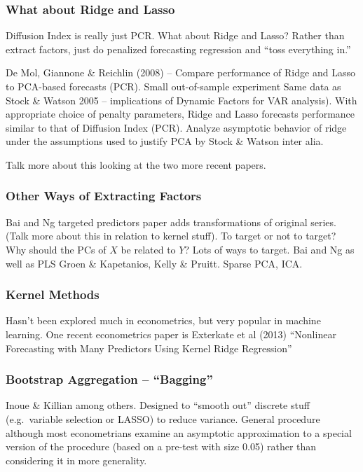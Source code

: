 \documentclass[handout]{beamer}
\begin{document}
\begin{frame}[c]\frametitle{What about Ridge and Lasso}
    
Diffusion Index is really just PCR. What about Ridge and Lasso? Rather than extract factors, just do penalized forecasting regression and ``toss everything in.''

De Mol, Giannone \& Reichlin (2008) -- Compare performance of Ridge and Lasso to PCA-based forecasts (PCR). Small out-of-sample experiment Same data as Stock \& Watson 2005 -- implications of Dynamic Factors for VAR analysis). With appropriate choice of penalty parameters, Ridge and Lasso forecasts performance similar to that of Diffusion Index (PCR). Analyze asymptotic behavior of ridge under the assumptions used to justify PCA by Stock \& Watson inter alia. 

Talk more about this looking at the two more recent papers.

\end{frame}
\begin{frame}[c]\frametitle{Other Ways of Extracting Factors}
    
Bai and Ng targeted predictors paper adds transformations of original series. (Talk more about this in relation to kernel stuff). To target or not to target? Why should the PCs of $X$ be related to $Y$? Lots of ways to target. Bai and Ng as well as PLS Groen \& Kapetanios, Kelly \& Pruitt. Sparse PCA, ICA.

\end{frame}
\begin{frame}[c]\frametitle{Kernel Methods}
   
   Hasn't been explored much in econometrics, but very popular in machine learning. One recent econometrics paper is Exterkate et al (2013) ``Nonlinear Forecasting with Many Predictors Using Kernel Ridge Regression''


\end{frame}
\begin{frame}[c]\frametitle{Bootstrap Aggregation -- ``Bagging''}
    
    Inoue \& Killian among others. Designed to ``smooth out'' discrete stuff (e.g.\ variable selection or LASSO) to reduce variance. General procedure although most econometrians examine an asymptotic approximation to a special version of the procedure (based on a pre-test with size 0.05) rather than considering it in more generality.


\end{frame}
\end{document}
